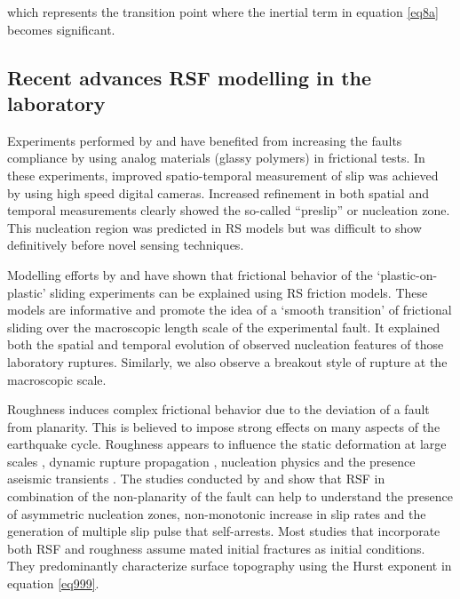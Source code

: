 \documentclass[final,3p, 11pt,authoryear]{elsarticle}
\begin{document}
\noindent which represents the transition point where the inertial term in equation \eqref{eq8a} becomes significant. 

\subsection{Recent advances RSF modelling in the laboratory}
\label{advances RSF}

Experiments performed by \citet{Nielsen2010} and \citet{Latour2013} have benefited from increasing the faults compliance by using analog materials (glassy polymers) in frictional tests. In these experiments, improved spatio-temporal measurement of slip was achieved by using high speed digital cameras. Increased refinement in both spatial and temporal measurements clearly showed the so-called ``preslip'' or nucleation zone.  This nucleation region was predicted in RS models \citep{Dieterich1992, Rubin2005, Ampuero2008} but was difficult to show definitively before novel sensing techniques.

Modelling efforts by \citet{Kaneko2011} and \citet{Kaneko2016} have shown that frictional behavior of the `plastic-on-plastic' sliding experiments can be explained using RS friction models. These models are informative and promote the idea of a `smooth transition' of frictional sliding over the macroscopic length scale of the experimental fault. It explained both the spatial and temporal evolution of observed nucleation features of those laboratory ruptures. Similarly, we also observe a breakout style of rupture at the macroscopic scale.

Roughness induces complex frictional behavior due to the deviation of a fault from planarity.  This is believed to impose strong effects on many aspects of the earthquake cycle.  Roughness appears to influence the static deformation at large scales \citep[e.g.][]{King1985}, dynamic rupture propagation \citep[e.g.][]{Dunham2011, Fang2013, Mai2018}, nucleation physics \citep[e.g.][]{Tal2018} and the presence aseismic transients \citep{Ozawa2019}. The studies conducted by \citet{Tal2018} and \citet{Ozawa2019} show that RSF in combination of the non-planarity of the fault can help to understand the presence of asymmetric nucleation zones, non-monotonic increase in slip rates and the generation of multiple slip pulse that self-arrests. Most studies that incorporate both RSF and roughness assume mated initial fractures as initial conditions. They predominantly characterize surface topography using the Hurst exponent in equation \eqref{eq999}.  
\end{document}
